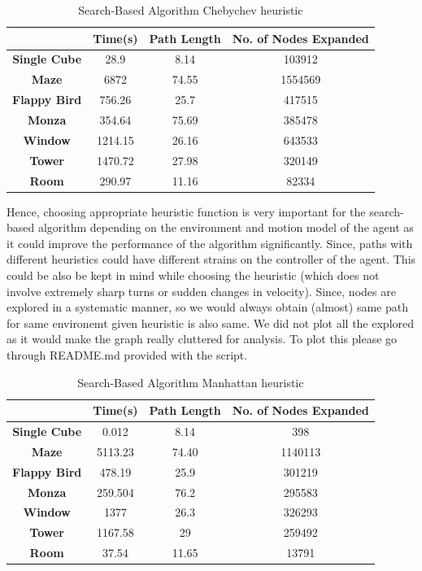 \documentclass[conference]{IEEEtran}
\begin{document}
\begin{table}[h]
    \centering
    \caption{Search-Based Algorithm Chebychev heuristic}
    \label{tab:tab2}
    \begin{tabular}{|c|c|c|c|}
    \hline
    & \textbf{Time(s)} & \textbf{Path Length} & \textbf{No. of Nodes Expanded} \\ \hline
    \textbf{Single Cube} & 28.9 & 8.14 & 103912 \\ \hline
    \textbf{Maze} & 6872 & 74.55 & 1554569 \\ \hline
    \textbf{Flappy Bird} & 756.26 & 25.7 & 417515 \\ \hline
    \textbf{Monza} & 354.64 & 75.69 & 385478 \\ \hline
    \textbf{Window} & 1214.15 & 26.16 & 643533 \\ \hline
    \textbf{Tower} & 1470.72 & 27.98 & 320149 \\ \hline
    \textbf{Room} & 290.97 & 11.16 & 82334 \\ \hline
    \end{tabular}
\end{table}
Hence, choosing appropriate heuristic function is very important for the search-based algorithm depending on the environment and motion model of the agent as it could improve the performance of the algorithm significantly. Since, paths with different heuristics
could have different strains on the controller of the agent. This could be also be kept in mind while choosing the heuristic (which does not involve extremely sharp turns or sudden changes in velocity).
Since, nodes are explored in a systematic manner, so we would always obtain (almost) same path for same environemt given heuristic is also same.
We did not plot all the explored as it would make the graph really cluttered for analysis. To plot this please go through README.md provided with the script.
\begin{table}[h]
    \centering
    \caption{Search-Based Algorithm Manhattan heuristic}
    \label{tab:tab3}
    \begin{tabular}{|c|c|c|c|}
    \hline
    & \textbf{Time(s)} & \textbf{Path Length} & \textbf{No. of Nodes Expanded} \\ \hline
    \textbf{Single Cube} & 0.012 & 8.14 & 398 \\ \hline
    \textbf{Maze} & 5113.23 & 74.40 & 1140113 \\ \hline
    \textbf{Flappy Bird} & 478.19 & 25.9 & 301219 \\ \hline
    \textbf{Monza} & 259.504 & 76.2 & 295583 \\ \hline
    \textbf{Window} & 1377 & 26.3 & 326293 \\ \hline
    \textbf{Tower} & 1167.58 & 29 & 259492 \\ \hline
    \textbf{Room} & 37.54 & 11.65 & 13791 \\ \hline
    \end{tabular}
\end{table}
\end{document}

